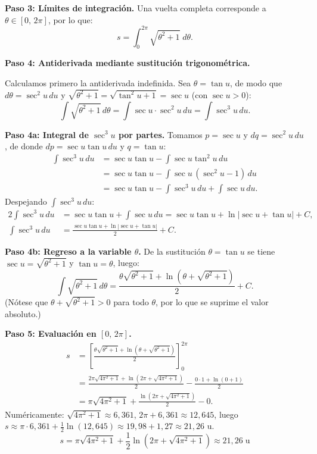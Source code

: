 \begin{example}
\begin{myproof}
\textbf{Paso 3: Límites de integración.}
Una vuelta completa corresponde a $\theta \in [0,\,2\pi]$, por lo que:
\[
  s = \int_{0}^{2\pi}\sqrt{\theta^2 + 1}\;d\theta.
\]

\textbf{Paso 4: Antiderivada mediante sustitución trigonométrica.}

Calculamos primero la antiderivada indefinida. Sea $\theta = \tan u$,
de modo que $d\theta = \sec^2 u\,du$ y
$\sqrt{\theta^2 + 1} = \sqrt{\tan^2 u + 1} = \sec u$ (con $\sec u > 0$):
\[
  \int\sqrt{\theta^2+1}\,d\theta
  = \int \sec u \cdot \sec^2 u\,du
  = \int \sec^3 u\,du.
\]

\textbf{Paso 4a: Integral de $\sec^3 u$ por partes.}
Tomamos $p = \sec u$ y $dq = \sec^2 u\,du$, de donde
$dp = \sec u\tan u\,du$ y $q = \tan u$:
\begin{align*}
  \int \sec^3 u\,du
  &= \sec u\tan u - \int \sec u\tan^2 u\,du \\
  &= \sec u\tan u - \int \sec u\,(\sec^2 u - 1)\,du \\
  &= \sec u\tan u - \int \sec^3 u\,du + \int \sec u\,du.
\end{align*}
Despejando $\int \sec^3 u\,du$:
\begin{align*}
  2\int \sec^3 u\,du
  &= \sec u\tan u + \int \sec u\,du
   = \sec u\tan u + \ln|\sec u + \tan u| + C,\\[4pt]
  \int \sec^3 u\,du
  &= \frac{\sec u\tan u + \ln|\sec u + \tan u|}{2} + C.
\end{align*}

\textbf{Paso 4b: Regreso a la variable $\theta$.}
De la sustitución $\theta = \tan u$ se tiene $\sec u = \sqrt{\theta^2+1}$
y $\tan u = \theta$, luego:
\[
  \int\sqrt{\theta^2+1}\,d\theta
  = \frac{\theta\sqrt{\theta^2+1} + \ln\!\left(\theta + \sqrt{\theta^2+1}\right)}{2}
    + C.
\]
(Nótese que $\theta + \sqrt{\theta^2+1} > 0$ para todo $\theta$, por lo
que se suprime el valor absoluto.)

\textbf{Paso 5: Evaluación en $[0,\,2\pi]$.}
\begin{align*}
  s
  &= \left[\frac{\theta\sqrt{\theta^2+1}
             + \ln\!\left(\theta + \sqrt{\theta^2+1}\right)}{2}
    \right]_{0}^{2\pi} \\[6pt]
  &= \frac{2\pi\sqrt{4\pi^2+1}
           + \ln\!\left(2\pi + \sqrt{4\pi^2+1}\right)}{2}
   - \frac{0\cdot 1 + \ln(0 + 1)}{2} \\[6pt]
  &= \pi\sqrt{4\pi^2+1}
     + \frac{\ln\!\left(2\pi + \sqrt{4\pi^2+1}\right)}{2}
     - 0.
\end{align*}
Numéricamente: $\sqrt{4\pi^2+1} \approx 6{,}361$, \;
$2\pi + 6{,}361 \approx 12{,}645$, luego
$s \approx \pi \cdot 6{,}361 + \tfrac{1}{2}\ln(12{,}645)
 \approx 19{,}98 + 1{,}27 \approx 21{,}26$ u.
\[
  \boxed{s = \pi\sqrt{4\pi^2+1}
           + \frac{1}{2}\ln\!\left(2\pi+\sqrt{4\pi^2+1}\right)
           \approx 21{,}26\;\text{u}}
\]
\end{myproof}
\end{example}


